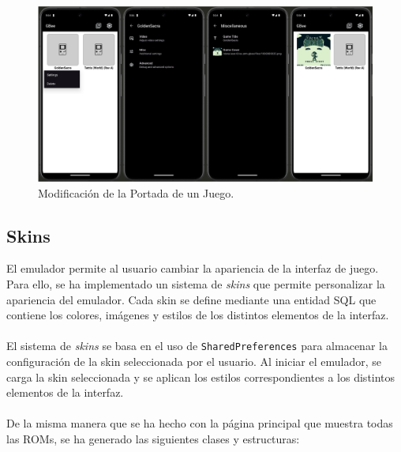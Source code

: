 \begin{figure}[H]
    \centering
    \includegraphics[width=1\textwidth]{include/images/settings_misc.png}
    \caption{Modificación de la Portada de un Juego.}\label{figure:miscFragment}
\end{figure}

\subsection{Skins}

El emulador permite al usuario cambiar la apariencia de la interfaz de juego. Para ello, se ha implementado un sistema de \textit{skins} que permite personalizar la apariencia del emulador. Cada skin se define mediante una entidad SQL que contiene los colores, imágenes y estilos de los distintos elementos de la interfaz.
\\\\
El sistema de \textit{skins} se basa en el uso de \texttt{SharedPreferences} para almacenar la configuración de la skin seleccionada por el usuario. Al iniciar el emulador, se carga la skin seleccionada y se aplican los estilos correspondientes a los distintos elementos de la interfaz.
\\\\
De la misma manera que se ha hecho con la página principal que muestra todas las ROMs, se ha generado las siguientes clases y estructuras:

